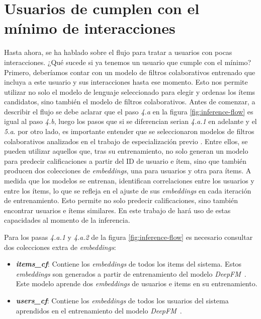 \documentclass[11pt,a4paper,twoside]{thesis}
\begin{document}
\section{Usuarios de cumplen con el mínimo de interacciones}

Hasta ahora, se ha hablado sobre el flujo para tratar a usuarios con pocas interacciones. ¿Qué sucede si ya tenemos un usuario que cumple con el mínimo? Primero, deberíamos contar con un modelo de filtros colaborativos entrenado que incluya a este usuario y sus interacciones hasta ese momento. Esto nos permite utilizar no solo el modelo de lenguaje seleccionado para elegir y ordenas los ítems candidatos, sino también el modelo de filtros colaborativos.
Antes de comenzar, a describir el flujo se debe aclarar que el paso \textit{4.a} en la figura \ref{fig:inference-flow} es igual al paso \textit{4.b}, luego los pasos que si se diferencian serian \textit{4.a.1} en adelante y el \textit{5.a}.
por otro lado, es importante entender que se seleccionaron modelos de filtros colaborativos analizados en el trabajo de especialización previo \cite{src}. Entre ellos, se pueden utilizar aquellos que, tras su entrenamiento, no solo generan un modelo para predecir calificaciones a partir del ID de usuario e ítem, sino que también producen dos colecciones de \textit{embeddings}, una para usuarios y otra para ítems. A medida que los modelos se entrenan, identifican correlaciones entre los usuarios y entre los ítems, lo que se refleja en el ajuste de sus \textit{embeddings} en cada iteración de entrenamiento. Esto permite no solo predecir calificaciones, sino también encontrar usuarios e ítems similares. En este trabajo de hará uso de estas capacidades al momento de la inferencia.

Para los pasas \textit{4.a.1} y \textit{4.a.2} de la figura \ref{fig:inference-flow} es necesario consultar dos colecciones extra de \textit{embeddings}:

\begin{itemize}
	\item \textbf{\textit{items\_cf}}: Contiene los \textit{embeddings} de todos los items del sistema. Estos \textit{embeddings} son generados a partir de entrenamiento del modelo \textit{DeepFM}~\cite{dfmpaper, didldfm}. Este modelo aprende dos \textit{embeddings} de usuarios e items en su entrenamiento.
	\item \textbf{\textit{users\_cf}}: Contiene los \textit{embeddings} de todos los usuarios del sistema aprendidos en el entrenamiento del modelo \textit{DeepFM}~\cite{dfmpaper, didldfm}.
\end{itemize}
\end{document}
